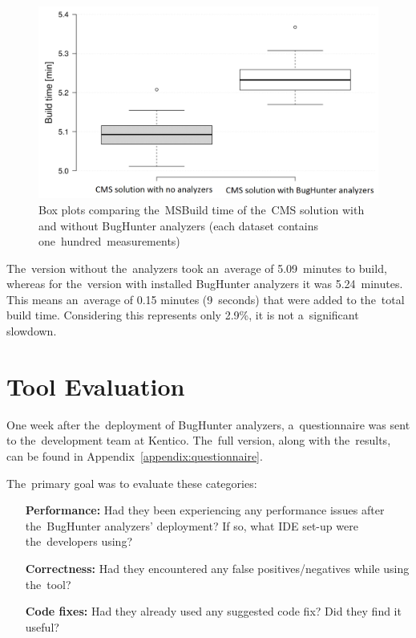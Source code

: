 \documentclass[
  digital, %
  table,   %
  lof,     %
  lot,     %
  oneside,
]{fithesis3}
\begin{document}
\begin{figure}[h!]
		\centering   
			\includegraphics[scale=0.26]{img/build-time-boxplots}
		\caption{Box plots comparing the~MSBuild time of the~CMS solution with and without BugHunter analyzers (each dataset contains one~hundred~measurements)}
		\label{fig:build-times-boxplots}
\end{figure}

The~version without the~analyzers took an~average of 5.09~minutes to build, whereas for the~version with installed BugHunter analyzers it was 5.24~minutes. This means an~average of 0.15 minutes (9~seconds) that were added to the~total build time. Considering this represents only 2.9\%, it is not a~significant slowdown.

\newpage
\section{Tool Evaluation}
One week after the~deployment of BugHunter analyzers, a~questionnaire was sent to the~development team at Kentico. The~full version, along with the~results, can be found in Appendix~\ref{appendix:questionnaire}. 

The~primary goal was to evaluate these categories:

\begin{itemize}
\item[\textbf{Performance:}] Had they been experiencing any performance issues after the~BugHunter analyzers' deployment? If so, what IDE set-up were the~developers using?

\item[\textbf{Correctness:}] Had they encountered any false positives/negatives while using the~tool?

\item[\textbf{Code fixes:}] Had they already used any suggested code fix? Did they find it useful?
\end{itemize}
\end{document}
